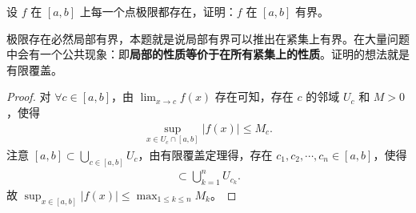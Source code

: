 \documentclass[../../main.tex]{subfiles}
\begin{document}
\begin{example}
设 \(f\) 在 \([a,b]\) 上每一个点极限都存在，证明：\(f\) 在 \([a,b]\) 有界。
\end{example}
\begin{note}
极限存在必然局部有界，本题就是说局部有界可以推出在紧集上有界。在大量问题中会有一个公共现象：即\textbf{局部的性质等价于在所有紧集上的性质}。证明的想法就是有限覆盖。 
\end{note}
\begin{proof}
对 \(\forall c\in [a,b]\)，由 \(\lim_{x\rightarrow c}f(x)\) 存在可知，存在 \(c\) 的邻域 \(U_c\) 和 \(M>0\)，使得
\begin{align*}
\sup_{x\in U_c\cap [a,b]}|f(x)|\leqslant M_c.
\end{align*}
注意 \([a,b]\subset \bigcup_{c\in [a,b]}U_c\)，由有限覆盖定理得，存在 \(c_1,c_2,\cdots,c_n\in [a,b]\)，使得
\begin{align*}
[a,b]\subset \bigcup_{k = 1}^nU_{c_k}. 
\end{align*}
故 \(\sup_{x\in [a,b]}|f(x)|\leqslant \max_{1\leqslant k\leqslant n}M_k\)。 

\end{proof}
\end{document}
